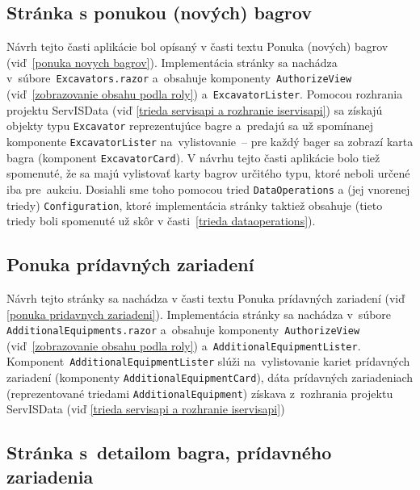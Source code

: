 \subsection{Stránka s ponukou (nových) bagrov}

Návrh tejto časti aplikácie bol opísaný v časti textu Ponuka (nových) bagrov (viď~\ref{ponuka novych bagrov}). Implementácia stránky sa nachádza v~súbore~\verb|Excavators.razor| a~obsahuje komponenty~\verb|AuthorizeView| (viď~\ref{zobrazovanie obsahu podla roly}) a~\verb|ExcavatorLister|. Pomocou rozhrania projektu ServISData (viď \ref{trieda servisapi a rozhranie iservisapi}) sa získajú objekty typu \verb|Excavator| reprezentujúce bagre a~predajú sa už spomínanej komponente \verb|ExcavatorLister| na~vylistovanie~-- pre každý bager sa zobrazí karta bagra (komponent \verb|ExcavatorCard|). V návrhu tejto časti aplikácie bolo tiež spomenuté, že sa majú vylistovať karty bagrov určitého typu, ktoré neboli určené iba pre~aukciu. Dosiahli sme toho pomocou tried \verb|DataOperations| a (jej vnorenej triedy) \verb|Configuration|, ktoré implementácia stránky taktiež obsahuje (tieto triedy boli spomenuté už skôr v časti~\ref{trieda dataoperations}).

\subsection{Ponuka prídavných zariadení}

Návrh tejto stránky sa nachádza v časti textu Ponuka prídavných zariadení (viď \ref{ponuka pridavnych zariadeni}). Implementácia stránky sa nachádza v~súbore \verb|AdditionalEquipments.razor| a~obsahuje komponenty~\verb|AuthorizeView| (viď~\ref{zobrazovanie obsahu podla roly}) a~\verb|AdditionalEquipmentLister|. Komponent~\verb|AdditionalEquipmentLister| slúži na~vylistovanie kariet prídavných zariadení (komponenty \verb|AdditionalEquipmentCard|), dáta prídavných zariadeniach (reprezentované triedami \verb|AdditionalEquipment|) získava z~rozhrania projektu ServISData (viď \ref{trieda servisapi a rozhranie iservisapi})

\subsection{Stránka s~detailom bagra, prídavného zariadenia}

